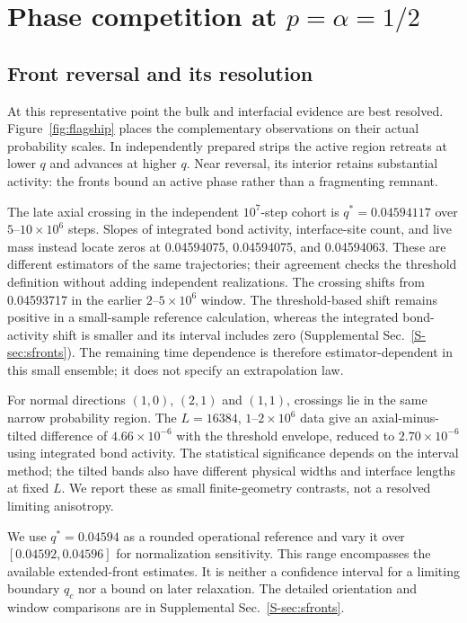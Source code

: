 \section{Phase competition at $p=\alpha=1/2$}
\label{sec:flagship}
\subsection{Front reversal and its resolution}
\label{sec:fronts}

At this representative point the bulk and interfacial evidence are best
resolved. Figure~\ref{fig:flagship} places the complementary observations
on their actual probability scales. In independently prepared strips the
active region retreats at lower $q$ and advances at higher $q$. Near
reversal, its interior retains substantial activity: the fronts bound an
active phase rather than a fragmenting remnant.

The late axial crossing in the independent $10^7$-step cohort is
$q^*=0.04594117$ over $5$--$10\times10^6$ steps. Slopes of integrated bond
activity, interface-site count, and live mass instead locate zeros at
0.04594075, 0.04594075, and 0.04594063. These are different estimators of
the same trajectories; their agreement checks the threshold definition
without adding independent realizations.
The crossing shifts from 0.04593717 in the earlier $2$--$5\times10^6$
window. The threshold-based shift remains positive in a small-sample reference
calculation, whereas the integrated bond-activity shift is smaller and
its interval includes zero (Supplemental Sec.~\ref{S-sec:sfronts}).
The remaining time dependence is therefore estimator-dependent in this
small ensemble; it does not specify an extrapolation law.

For normal directions $(1,0)$, $(2,1)$ and $(1,1)$, crossings lie in the
same narrow probability region. The $L=16384$, $1$--$2\times10^6$ data
give an axial-minus-tilted difference of $4.66\times10^{-6}$ with the
threshold envelope, reduced to $2.70\times10^{-6}$ using integrated bond
activity. The statistical significance depends on the interval method;
the tilted bands also have different physical widths and interface
lengths at fixed $L$. We report these as small finite-geometry contrasts,
not a resolved limiting anisotropy.

We use $q^*=0.04594$ as a rounded operational reference and vary it over
$[0.04592,0.04596]$ for normalization sensitivity. This range encompasses
the available extended-front estimates. It is neither a confidence
interval for a limiting boundary $q_c$ nor a bound on later relaxation.
The detailed orientation and window comparisons are in Supplemental
Sec.~\ref{S-sec:sfronts}.

